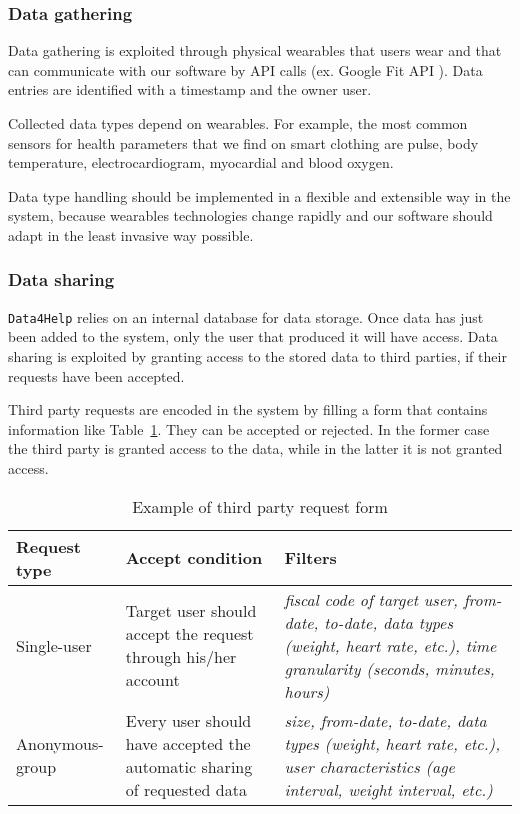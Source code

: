     \subsubsection{Data gathering}
    \label{sec:datagathering}

      Data gathering is exploited through physical wearables that users wear and that can communicate with our software by API calls (ex. Google Fit API \cite{googlefitapi}). Data entries are identified with a timestamp and the owner user.

      Collected data types depend on wearables. For example, the most common sensors for health parameters that we find on smart clothing \cite{sensors} are pulse, body temperature, electrocardiogram, myocardial and blood oxygen.

      Data type handling should be implemented in a flexible and extensible way in the system, because wearables technologies change rapidly and our software should adapt in the least invasive way possible.

    \subsubsection{Data sharing}

      \texttt{Data4Help} relies on an internal database for data storage. Once data has just been added to the system, only the user that produced it will have access. Data sharing is exploited by granting access to the stored data to third parties, if their requests have been accepted.

      Third party requests are encoded in the system by filling a form that contains information like Table~\ref{tab:tprequest}. They can be accepted or rejected. In the former case the third party is granted access to the data, while in the latter it is not granted access.

      \begin{table}[h!]
        \centering
        \begin{tabularx}{\linewidth}{|l|X|X|}
          \hline
          \textbf{Request type} & \textbf{Accept condition}                                               & \textbf{Filters}                                                                                                                           \\ \hline
          Single-user           & Target user should accept the request through his/her account                                   & \textit{fiscal code of target user, from-date, to-date, data types (weight, heart rate, etc.), time granularity (seconds, minutes, hours)} \\ \hline
          Anonymous-group       & Every user should have accepted the automatic sharing of requested data & \textit{size, from-date, to-date, data types (weight, heart rate, etc.), user characteristics (age interval, weight interval, etc.)}       \\ \hline
        \end{tabularx}
        \caption{Example of third party request form}
        \label{tab:tprequest}
      \end{table}

